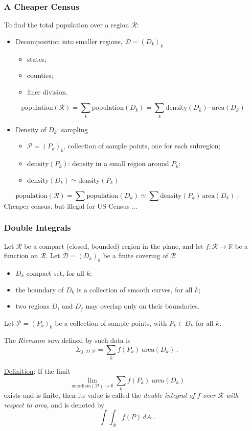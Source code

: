 \begin{frame}
  \frametitle{A Cheaper Census}

  To find the total population over a region $\mathcal{R}$:\pause
  \begin{itemize}
    \item Decomposition into smaller regions, $\mathcal{D} = (D_k)_k$\pause
\begin{itemize}
  \item states;
  \item counties;
  \item finer division.
\end{itemize}
%
\pause
$$\text{population}(\mathcal{R}) = \sum_k \text{population}(D_k) = \sum_k \text{density}(D_k) \cdot \text{area}(D_k)$$

\item \pause Density of $D_k$: \pause sampling
\begin{itemize}
  \item $\mathcal{P} = (P_k)_k$, collection of sample points, one for each subregion;
  \item $\text{density}(P_k)$: density in a small region around $P_k$;
  \item $\text{density}(D_k) \simeq \text{density}(P_k)$
\end{itemize}
\end{itemize}
\pause
$$\text{population}(\mathcal{R}) = \sum \text{population}(D_k) \simeq \sum \text{density}(P_k) \, \text{area}(D_k)\; .$$
%
\pause
Cheaper census, \pause but illegal for US Census ...

\end{frame}

\begin{frame}
  \frametitle{Double Integrals}

  Let $\mathcal{R}$ be a compact (closed, bounded) region in the plane, and let $f \colon \mathcal{R} \to \mathbb{R}$ be a function on $\mathcal{R}$.
  \pause
  Let $\mathcal{D} = (D_k)_k$ be a finite covering of $\mathcal{R}$
%
\begin{itemize}
  \item $D_k$ compact set, for all $k$;
  \item the boundary of $D_k$ is a collection of smooth curves, for all $k$;
  \item two regions $D_i$ and $D_j$ may overlap only on their boundaries.
\end{itemize}

\pause Let $\mathcal{P} = (P_k)_k$ be a collection of sample points, with $P_k \in D_k$ for all $k$.

\pause
The \emph{Riemann sum} defined by such data is
%
$$\Sigma_{f,\mathcal{D}, \mathcal{P}} = \sum_k f(P_k) \; \text{area}(D_k)\; .$$

\pause \underline{Definition}: If the limit
%
$$\lim_{\text{maxdiam}(\mathcal{D}) \to 0} \sum_k f(P_k) \; \text{area}(D_k)$$
%
exists and is finite, then its value is called the \emph{double integral of $f$ over $\mathcal{R}$ with respect to area}, and is denoted by
%
$$\int\!\!\!\int_{\mathcal{R}} f(P) \, dA \; .$$
\end{frame}


